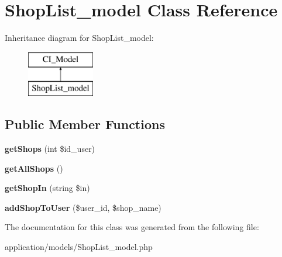 \hypertarget{class_shop_list__model}{}\section{Shop\+List\+\_\+model Class Reference}
\label{class_shop_list__model}
Inheritance diagram for Shop\+List\+\_\+model\+:\begin{figure}[H]
\begin{center}
\leavevmode
\includegraphics[height=2.000000cm]{class_shop_list__model}
\end{center}
\end{figure}
\subsection*{Public Member Functions}
\begin{DoxyCompactItemize}
\item 
\mbox{\label{class_shop_list__model_ae033cd78c033b7cc3796a24994e451a5}} 
{\bfseries get\+Shops} (int \$id\+\_\+user)
\item 
\mbox{\label{class_shop_list__model_a199cefde9fd328894e3498b1cd3ac37d}} 
{\bfseries get\+All\+Shops} ()
\item 
\mbox{\label{class_shop_list__model_a9d8bcfe6c594f4c9d148b67d2e3322ac}} 
{\bfseries get\+Shop\+In} (string \$in)
\item 
\mbox{\label{class_shop_list__model_aced1f7b553d96d232bb3493adde7c28f}} 
{\bfseries add\+Shop\+To\+User} (\$user\+\_\+id, \$shop\+\_\+name)
\end{DoxyCompactItemize}


The documentation for this class was generated from the following file\+:\begin{DoxyCompactItemize}
\item 
application/models/Shop\+List\+\_\+model.\+php\end{DoxyCompactItemize}
